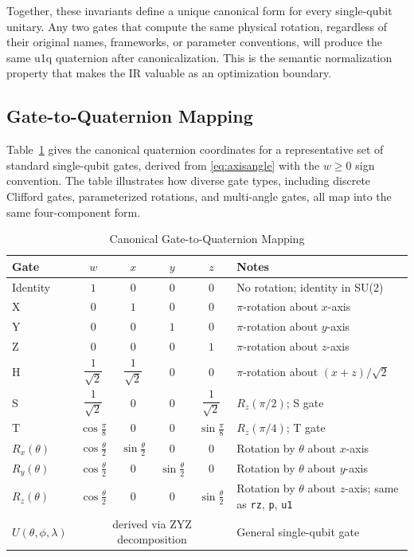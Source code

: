 \documentclass[conference]{IEEEtran}
\begin{document}
Together, these invariants define a unique canonical form for every single-qubit unitary.
Any two gates that compute the same physical rotation, regardless of their original
names, frameworks, or parameter conventions, will produce the same u1q quaternion after
canonicalization. This is the semantic normalization property that makes the IR valuable
as an optimization boundary.

\subsection{Gate-to-Quaternion Mapping}

Table~\ref{tab:gatemapping} gives the canonical quaternion coordinates for a representative
set of standard single-qubit gates, derived from \eqref{eq:axisangle} with the $w \geq 0$
sign convention. The table illustrates how diverse gate types, including discrete Clifford gates,
parameterized rotations, and multi-angle gates, all map into the same four-component form.

\begin{table}[htbp]
\renewcommand{\arraystretch}{1.35}
\caption{Canonical Gate-to-Quaternion Mapping}
\begin{center}
\begin{tabular}{lccccl}
\toprule
\textbf{Gate} & $w$ & $x$ & $y$ & $z$ & \textbf{Notes} \\
\midrule
Identity          & $1$ & $0$ & $0$ & $0$
  & No rotation; identity in SU(2) \\[2pt]
X                 & $0$ & $1$ & $0$ & $0$
  & $\pi$-rotation about $x$-axis \\[2pt]
Y                 & $0$ & $0$ & $1$ & $0$
  & $\pi$-rotation about $y$-axis \\[2pt]
Z                 & $0$ & $0$ & $0$ & $1$
  & $\pi$-rotation about $z$-axis \\[2pt]
H                 & $\dfrac{1}{\sqrt{2}}$ & $\dfrac{1}{\sqrt{2}}$ & $0$ & $0$
  & $\pi$-rotation about $(x{+}z)/\sqrt{2}$ \\[8pt]
S                 & $\dfrac{1}{\sqrt{2}}$ & $0$ & $0$ & $\dfrac{1}{\sqrt{2}}$
  & $R_z(\pi/2)$; S gate \\[8pt]
T                 & $\cos\!\tfrac{\pi}{8}$ & $0$ & $0$ & $\sin\!\tfrac{\pi}{8}$
  & $R_z(\pi/4)$; T gate \\[6pt]
$R_x(\theta)$     & $\cos\!\tfrac{\theta}{2}$ & $\sin\!\tfrac{\theta}{2}$ & $0$ & $0$
  & Rotation by $\theta$ about $x$-axis \\[4pt]
$R_y(\theta)$     & $\cos\!\tfrac{\theta}{2}$ & $0$ & $\sin\!\tfrac{\theta}{2}$ & $0$
  & Rotation by $\theta$ about $y$-axis \\[4pt]
$R_z(\theta)$     & $\cos\!\tfrac{\theta}{2}$ & $0$ & $0$ & $\sin\!\tfrac{\theta}{2}$
  & Rotation by $\theta$ about $z$-axis; same as \texttt{rz}, \texttt{p}, \texttt{u1} \\[4pt]
$U(\theta,\phi,\lambda)$ & \multicolumn{4}{c}{derived via ZYZ decomposition}
  & General single-qubit gate \\[2pt]
\bottomrule
\end{tabular}
\label{tab:gatemapping}
\end{center}
\end{table}
\end{document}
